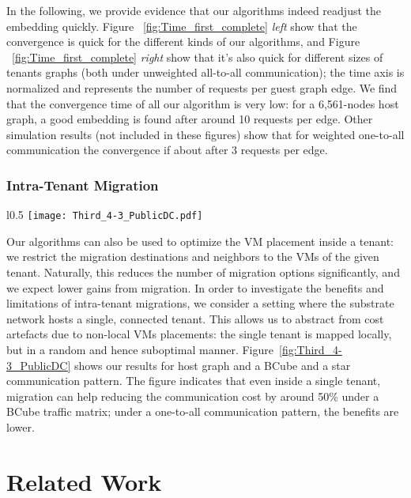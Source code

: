 \documentclass[conference]{IEEEtran}
\def\BC#1#2{BCube(#1,#2)}
\begin{document}
In the following, we provide evidence that our algorithms indeed readjust the embedding quickly. Figure ~\ref{fig:Time_first_complete} \emph{left} show that the convergence is quick for the different kinds of our algorithms, and Figure ~\ref{fig:Time_first_complete} \emph{right} show that it's also quick for different sizes of tenants graphs (both under unweighted all-to-all communication); the time axis is normalized and represents the number of requests per guest graph edge.
We find that the convergence time of all our algorithm is very low: for a 6,561-nodes host graph, a good embedding is found after around 10 requests per edge. Other simulation results (not included in these figures) show that for weighted one-to-all communication the convergence if about after 3 requests per edge.

\subsubsection{Intra-Tenant Migration}

\begin{wrapfigure}{l}{0.5\columnwidth}
				\centering
				\texttt{[image: Third\_4-3\_PublicDC.pdf]}
				\caption{Amortized communication cost on host graph \BC{3}{3}, and a BCube as well as a
star communication pattern (weighted).}
				\label{fig:Third_4-3_PublicDC}
\end{wrapfigure}
Our algorithms can also be used to optimize the VM placement inside a tenant: we restrict the migration destinations and neighbors
to the VMs of the given tenant. Naturally, this reduces the number of migration options significantly, and we expect lower gains from migration.
In order to investigate the benefits and limitations of intra-tenant migrations, we consider a setting where the substrate network
hosts a single, connected tenant. This allows us to abstract from cost artefacts due to non-local VMs placements: the single tenant
is mapped locally, but in a random and hence suboptimal manner.
Figure~\ref{fig:Third_4-3_PublicDC} shows our results for host graph  and
a BCube and a star communication pattern. The figure indicates that
even inside a single tenant, migration can help reducing the communication
cost by around 50\% under a BCube traffic matrix; under a one-to-all
communication pattern, the benefits are lower.






\section{Related Work}\label{sec:relwork}
\end{document}
